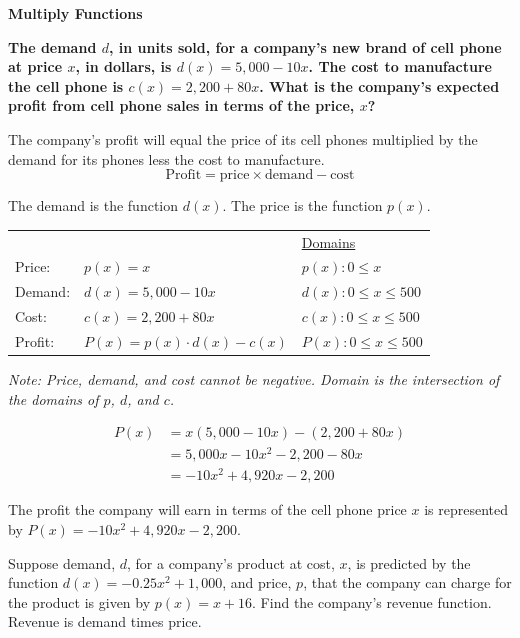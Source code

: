 \documentclass{article}
\newenvironment{example}[1]{}{}
\newenvironment{tryit}[1]{}{}
\newcommand{\placeholder}[2]{}
\begin{document}
\begin{example}{2}
\textbf{Multiply Functions}

\textbf{The demand $d$, in units sold, for a company's new brand of cell phone at price $x$, in dollars, is $d(x) = 5,000 - 10x$. The cost to manufacture the cell phone is $c(x) = 2,200 + 80x$. What is the company's expected profit from cell phone sales in terms of the price, $x$?}

\placeholder{illustration}{A profit chart equals a cell phone with a price tag times many cell phones representing demand minus cell phone parts representing cost}

The company's profit will equal the price of its cell phones multiplied by the demand for its phones less the cost to manufacture.
\[ \text{Profit} = \text{price} \times \text{demand} - \text{cost} \]

The demand is the function $d(x)$. The price is the function $p(x)$.

\begin{tabular}{lll}
& & \underline{Domains} \\
Price: & $p(x) = x$ & $p(x): 0 \leq x$ \\
Demand: & $d(x) = 5,000 - 10x$ & $d(x): 0 \leq x \leq 500$ \\
Cost: & $c(x) = 2,200 + 80x$ & $c(x): 0 \leq x \leq 500$ \\
Profit: & $P(x) = p(x) \cdot d(x) - c(x)$ & $P(x): 0 \leq x \leq 500$ \\
\end{tabular}

\textit{Note: Price, demand, and cost cannot be negative. Domain is the intersection of the domains of $p$, $d$, and $c$.}

\begin{align*}
P(x) &= x(5,000 - 10x) - (2,200 + 80x) \\
&= 5,000x - 10x^2 - 2,200 - 80x \\
&= -10x^2 + 4,920x - 2,200
\end{align*}

The profit the company will earn in terms of the cell phone price $x$ is represented by $P(x) = -10x^2 + 4,920x - 2,200$.
\end{example}

\begin{tryit}{2}
Suppose demand, $d$, for a company's product at cost, $x$, is predicted by the function $d(x) = -0.25x^2 + 1,000$, and price, $p$, that the company can charge for the product is given by $p(x) = x + 16$. Find the company's revenue function. Revenue is demand times price.
\end{tryit}
\end{document}
